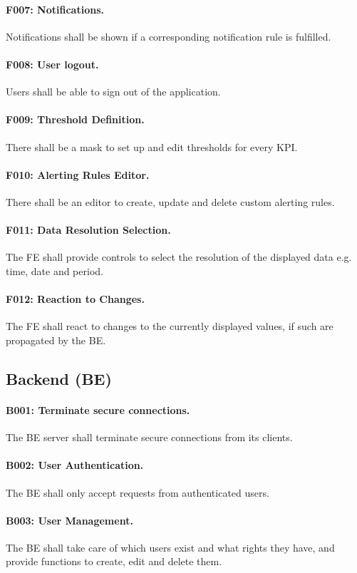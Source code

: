 \documentclass{scrreprt}
\begin{document}
\paragraph{F007: Notifications.} Notifications shall be shown if a corresponding notification rule is fulfilled.
\paragraph{F008: User logout.} Users shall be able to sign out of the application.
\paragraph{F009: Threshold Definition.} There shall be a mask to set up and edit thresholds for every KPI.
\paragraph{F010: Alerting Rules Editor.} There shall be an editor to create, update and delete custom alerting rules.
\paragraph{F011: Data Resolution Selection.} The FE shall provide controls to select the resolution of the displayed data e.g. time, date and period.
\paragraph{F012: Reaction to Changes.} The FE shall react to changes to the currently displayed values, if such are propagated by the BE.

\subsection{Backend (BE)}
\paragraph{B001: Terminate secure connections.} The BE server shall terminate secure connections from its clients.
\paragraph{B002: User Authentication.} The BE shall only accept requests from authenticated users.
\paragraph{B003: User Management.} The BE shall take care of which users exist and what rights they have, and provide functions to create, edit and delete them.
\end{document}
